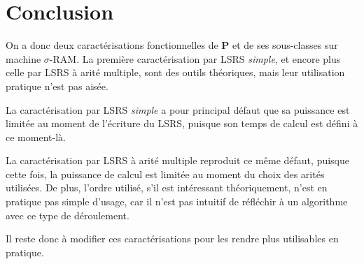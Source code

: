 	
	
	\pagebreak
	
	
	\section*{Conclusion}
	
	On a donc deux caractérisations fonctionnelles de $\textbf{P}$ et de ses sous-classes sur machine $\sigma$-RAM. La première caractérisation par LSRS \emph{simple}, et encore plus celle par LSRS à arité multiple, sont des outils théoriques, mais leur utilisation pratique n'est pas aisée.
	
	La caractérisation par LSRS \emph{simple} a pour principal défaut que sa puissance est limitée au moment de l'écriture du LSRS, puisque son temps de calcul est défini à ce moment-là. 
	
	La caractérisation par LSRS à arité multiple reproduit ce même défaut, puisque cette fois, la puissance de calcul est limitée au moment du choix des arités utilisées. De plus, l'ordre utilisé, s'il est intéressant théoriquement, n'est en pratique pas simple d'usage, car il n'est pas intuitif de réfléchir à un algorithme avec ce type de déroulement.
	
	Il reste donc à modifier ces caractérisations pour les rendre plus utilisables en pratique. 
	
	
	
	
	
%	
%	
%	
	
	
	
	
	
	
	
	
	
	
%	
%	
%	
%

















